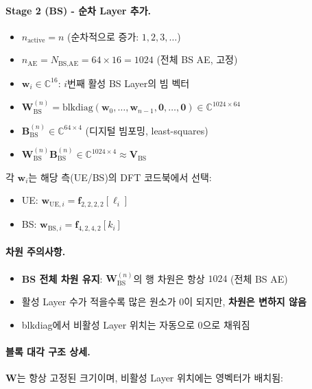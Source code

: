 \documentclass[10pt]{article}
\begin{document}
\paragraph{Stage 2 (BS) - 순차 Layer 추가.}
\begin{itemize}
    \item $n_{\text{active}} = n$ (순차적으로 증가: $1, 2, 3, \ldots$)
    \item $n_{\text{AE}} = N_{\text{BS,AE}} = 64 \times 16 = 1024$ (전체 BS AE, 고정)
    \item $\mathbf{w}_i \in \mathbb{C}^{16}$: $i$번째 활성 BS Layer의 빔 벡터
    \item $\mathbf{W}_{\text{BS}}^{(n)} = \text{blkdiag}(\mathbf{w}_0, \ldots, \mathbf{w}_{n-1}, \mathbf{0}, \ldots, \mathbf{0}) \in \mathbb{C}^{1024 \times 64}$
    \item $\mathbf{B}_{\text{BS}}^{(n)} \in \mathbb{C}^{64 \times 4}$ (디지털 빔포밍, least-squares)
    \item $\mathbf{W}_{\text{BS}}^{(n)} \mathbf{B}_{\text{BS}}^{(n)} \in \mathbb{C}^{1024 \times 4} \approx \mathbf{V}_{\text{BS}}$
\end{itemize}

각 $\mathbf{w}_i$는 해당 측(UE/BS)의 DFT 코드북에서 선택:
\begin{itemize}
    \item UE: $\mathbf{w}_{\text{UE},i} = \mathbf{f}_{2,2,2,2}[\ell_i]$
    \item BS: $\mathbf{w}_{\text{BS},i} = \mathbf{f}_{4,2,4,2}[k_i]$
\end{itemize}

\paragraph{차원 주의사항.}
\begin{itemize}
    \item \textbf{BS 전체 차원 유지}: $\mathbf{W}_{\text{BS}}^{(n)}$의 행 차원은 항상 $1024$ (전체 BS AE)
    \item 활성 Layer 수가 적을수록 많은 원소가 0이 되지만, \textbf{차원은 변하지 않음}
    \item blkdiag에서 비활성 Layer 위치는 자동으로 0으로 채워짐
\end{itemize}

\paragraph{블록 대각 구조 상세.}
$\mathbf{W}$는 항상 고정된 크기이며, 비활성 Layer 위치에는 영벡터가 배치됨:
\end{document}
